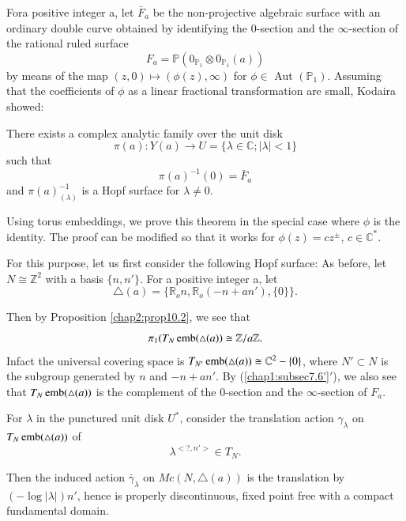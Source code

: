 For\pageoriginale a positive integer a, let $\bar{F}_a$ be the
non-projective algebraic surface with an ordinary double curve
obtained by identifying the 0-section and the $\infty$-section  of
the rational ruled surface  
$$
F_a = \mathbb{P} (0_{\mathbb{P}_1} \otimes 0_{\mathbb{P}_1} (a)) 
$$
by means of the map $(z, 0) \mapsto (\phi (z), \infty)$ for $\phi
\in$  Aut  $(\mathbb{P}_1)$. Assuming that the coefficients of $\phi$
as a linear fractional transformation are small, Kodaira \cite[III,
  Thm 45]{keyK3} showed: 

\begin{theorem*}
There exists a complex analytic family over the unit disk 
$$
\pi (a) : Y (a) \longrightarrow U = \{ \lambda \in \mathbb{C} ; |
\lambda | < 1 \} 
$$
such that 
$$
\pi (a) ^{-1}(0) = \bar{F}_a   
$$
and $\pi(a)^{-1}_{(\lambda)}$ is a Hopf surface for $\lambda \neq 
0$. 
\end{theorem*}

Using torus embeddings, we prove this theorem in the special case
where $\phi$ is the identity. The proof can be modified so that it
works for $\phi (z) = cz^{\pm}$, $c \in \mathbb{C}^*$. 

For this purpose, let us first consider the following Hopf surface: As 
before, let $N \cong \mathbb{Z}^2$ with a basis $\{ n, n'\}$. For a
positive integer a, let 
$$
\triangle (a) = \{\mathbb{R}_o n, \mathbb{R}_o (-n + an'), \{0 \} \}. 
$$ 

\noindent
Then by Proposition \ref{chap2:prop10.2}, we see that 
$$
\pi_1 (T_N \operatorname{emb} (\triangle (a)) \cong \mathbb{Z} / a \mathbb{Z}.
$$
In\pageoriginale fact the universal covering space is $T_{N'} \operatorname{emb}
(\triangle (a)) \cong \mathbb{C}^{2}  - \{0\}$, where $N' \subset N$
is the subgroup generated by  $n$ and $-n + an'$. By
(\ref{chap1:subsec7.6'}$'$), we also 
see that $T_{N}\operatorname{emb}(\triangle(a))$  is the complement of the
0-section and the $\infty$-section of $F_{a}$.   

For $\lambda$ in the punctured unit disk $U^{*}$, consider the
translation action $\gamma_{\lambda}$ on $T_{N}\operatorname{emb}(\triangle(a))$ of  
$$
\lambda^{< ?, n'>}\in T_{N}. 
$$ 

Then the induced action $\bar{\gamma}_{\lambda}$ on $Mc (N,
\triangle(a))$ is the translation by $(-\log | \lambda |) n'$, hence
is properly discontinuous, fixed point free with a compact fundamental
domain.   

